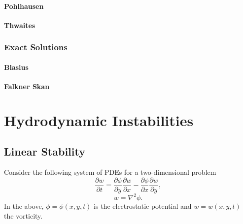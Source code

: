 \documentclass[oneside,a4paper,11pt]{report}
\begin{document}
\subsection{Pohlhausen}

\subsection{Thwaites}

\section{Exact Solutions}

\subsection{Blasius}

\subsection{Falkner Skan}

\part{Hydrodynamic Instabilities}                                             %

%
\chapter{Linear Stability}
%
Consider the following system of PDEs for a two-dimensional problem
\begin{equation}
    \frac{\partial w}{\partial t} = \frac{\partial \phi}{\partial y}\frac{\partial w}{\partial x} - \frac{\partial \phi}{\partial x} \frac{\partial w}{\partial y},
\end{equation}
\begin{equation}
    w = \nabla^2 \phi .
\end{equation}
In the above, $\phi = \phi(x,y,t)$ is the electrostatic potential and $w = w(x,y,t)$ the vorticity.
\end{document}
